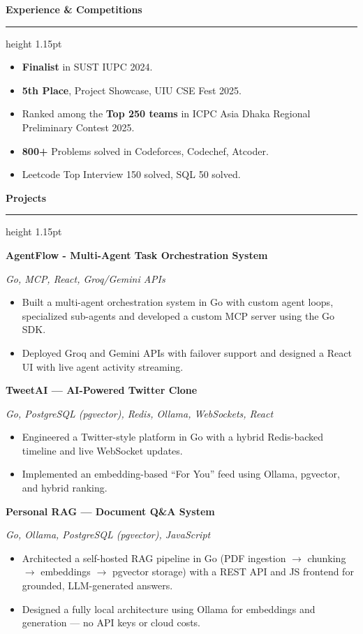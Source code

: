 \documentclass[11pt,a4paper]{article}
\newcommand{\resumesection}[1]{%
  \vspace{4.5pt}%
  {\fontsize{13}{14}\selectfont\bfseries\color{techBlue}#1}\par
  \vspace{6.5pt}\nointerlineskip
  {\color{techBlue}\hrule height 1.15pt}%
  \vspace{4.5pt}
}
\newcommand{\project}[2]{%
  {\fontsize{12}{12.8}\selectfont\bfseries #1}\par
  {\fontsize{11}{11.6}\selectfont\itshape\color{resumeBlue}#2}\par
}
\newenvironment{resumelist}{%
  \begin{itemize}[leftmargin=18pt,label=\textbullet,itemsep=0.9pt,topsep=0pt,
    parsep=0pt,partopsep=0pt]
}{\end{itemize}}
\begin{document}
\resumesection{Experience \& Competitions}
\begin{resumelist}
  \item \textbf{Finalist} in SUST IUPC 2024.
  \item \textbf{5th Place}, Project Showcase, UIU CSE Fest 2025.
  \item Ranked among the \textbf{Top 250 teams} in ICPC Asia Dhaka Regional Preliminary Contest 2025.
  \item \textbf{800+} Problems solved in Codeforces, Codechef, Atcoder.
  \item Leetcode Top Interview 150 solved, SQL 50 solved.
\end{resumelist}

\resumesection{Projects}
\project{AgentFlow - Multi-Agent Task Orchestration System}{Go, MCP, React, Groq/Gemini APIs}
\begin{resumelist}
  \item Built a multi-agent orchestration system in Go with custom agent loops, specialized sub-agents and developed a custom MCP server using the Go SDK.
  \item Deployed Groq and Gemini APIs with failover support and designed a React UI with live agent activity streaming.
\end{resumelist}
\vspace{5.2pt}

\project{TweetAI --- AI-Powered Twitter Clone}{Go, PostgreSQL (pgvector), Redis, Ollama, WebSockets, React}
\begin{resumelist}
  \item Engineered a Twitter-style platform in Go with a hybrid Redis-backed timeline and live WebSocket updates.
  \item Implemented an embedding-based ``For You'' feed using Ollama, pgvector, and hybrid ranking.
\end{resumelist}
\vspace{5.2pt}

\project{Personal RAG --- Document Q\&A System}{Go, Ollama, PostgreSQL (pgvector), JavaScript}
\begin{resumelist}
  \item Architected a self-hosted RAG pipeline in Go (PDF ingestion $\rightarrow$ chunking $\rightarrow$ embeddings $\rightarrow$ pgvector storage) with a REST API and JS frontend for grounded, LLM-generated answers.
  \item Designed a fully local architecture using Ollama for embeddings and generation --- no API keys or cloud costs.
\end{resumelist}
\vspace{5.2pt}
\end{document}
